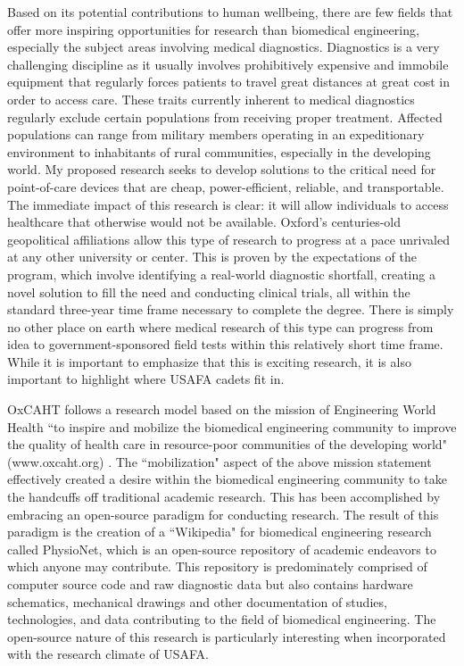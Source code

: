 \documentclass{article}
\begin{document}
Based on its potential contributions to human wellbeing, there are few fields
that offer more inspiring opportunities for research than biomedical engineering, especially the subject areas involving medical diagnostics.
Diagnostics is a very challenging discipline as it usually involves
prohibitively expensive and immobile equipment that regularly forces patients
to travel great distances at great cost in order to access care. These traits
currently inherent to medical diagnostics regularly exclude certain
populations from receiving proper
treatment. Affected populations can range from military members operating in an
expeditionary environment to inhabitants of rural communities, especially in the developing
world. My proposed research seeks to develop solutions to the critical need for
point-of-care devices that are cheap, power-efficient, reliable, and
transportable. The immediate impact of this research is clear: it will allow
individuals to access healthcare that otherwise would not be available. Oxford's
centuries-old geopolitical affiliations allow this type of research to progress 
at a pace unrivaled at any other university or center. This is proven by the
expectations of the program, which involve identifying a real-world diagnostic 
shortfall, creating a novel solution to fill the need and conducting
clinical trials, all within the standard three-year time frame necessary to 
complete the degree. There is simply no other place on earth where medical research of
this type can progress from idea to government-sponsored field tests within this relatively short
time frame. While it is important to emphasize that this is exciting research,
it is also important to highlight where USAFA cadets fit in.
 
OxCAHT follows a research model based on the mission of Engineering World
Health ``to inspire and mobilize the biomedical engineering community to improve
the quality of health care in resource-poor communities of the developing
world" (www.oxcaht.org) . The ``mobilization" aspect of the above mission
statement effectively created a desire within the biomedical engineering 
community to take the handcuffs off traditional academic research. This has
been accomplished by embracing an open-source paradigm for conducting research.
The result of this paradigm is the creation of a ``Wikipedia" for biomedical
engineering research called PhysioNet, which is an open-source repository of
academic endeavors to which anyone may contribute. This repository is
predominately comprised of computer source code and raw diagnostic data but
also contains hardware schematics, mechanical drawings and other documentation
of studies, technologies, and data contributing to the field of biomedical
engineering. The open-source nature of this research is particularly
interesting when incorporated with the research climate of USAFA.
 
\end{document}
